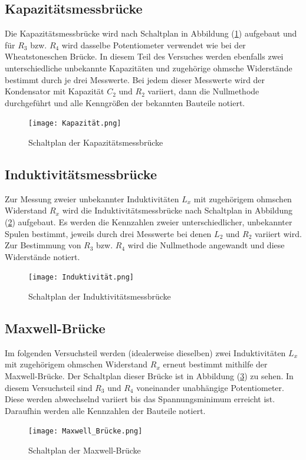 \subsection{Kapazitätsmessbrücke}
Die Kapazitätsmessbrücke wird nach Schaltplan in Abbildung (\ref{pic:Kapazitätsmessbrücke}) aufgebaut und für $R_3$ bzw. $R_4$ wird dasselbe Potentiometer
verwendet wie bei der Wheatstoneschen Brücke. In diesem Teil des Versuches werden ebenfalls zwei unterschiedliche unbekannte Kapazitäten und zugehörige 
ohmsche Widerstände bestimmt durch je drei Messwerte. Bei jedem dieser Messwerte wird der Kondensator mit Kapazität $C_2$ und $R_2$ variiert, dann die Nullmethode durchgeführt und alle Kenngrößen
der bekannten Bauteile notiert. 
\begin{figure}[H]
    \centering
    \texttt{[image: Kapazität.png]}
    \caption{Schaltplan der Kapazitätsmessbrücke}
    \label{pic:Kapazitätsmessbrücke}
\end{figure}
\subsection{Induktivitätsmessbrücke}
Zur Messung zweier unbekannter Induktivitäten $L_x$ mit zugehörigem ohmschen Widerstand $R_x$ wird die Induktivitätsmessbrücke nach Schaltplan in Abbildung 
(\ref{pic:Induktivitätsmessbrücke}) aufgebaut. Es werden die Kennzahlen zweier unterschiedlicher, unbekannter Spulen bestimmt, jeweils durch drei Messwerte bei 
denen $L_2$ und $R_2$ variiert wird. Zur Bestimmung von $R_3$ bzw. $R_4$ wird die Nullmethode angewandt und diese Widerstände notiert. 
\begin{figure}[H]
    \centering
    \texttt{[image: Induktivität.png]}
    \caption{Schaltplan der Induktivitätsmessbrücke}
    \label{pic:Induktivitätsmessbrücke}
\end{figure} 
\subsection{Maxwell-Brücke}
Im folgenden Versuchsteil werden (idealerweise dieselben) zwei Induktivitäten $L_x$ mit zugehörigem ohmschen Widerstand $R_x$ erneut bestimmt mithilfe der 
Maxwell-Brücke. Der Schaltplan dieser Brücke ist in Abbildung (\ref{pic:Maxwell-Brücke}) zu sehen. In diesem Versuchsteil sind $R_3$ und $R_4$ voneinander unabhängige
Potentiometer. Diese werden abwechselnd variiert bis das Spannungsminimum erreicht ist. Daraufhin werden alle Kennzahlen der Bauteile notiert. 
\begin{figure}[H]
    \centering
    \texttt{[image: Maxwell\_Brücke.png]}
    \caption{Schaltplan der Maxwell-Brücke}
    \label{pic:Maxwell-Brücke}
\end{figure} 
